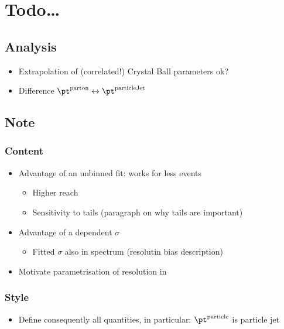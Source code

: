

\section{Todo\ldots}

\subsection{Analysis}
\begin{itemize}
\item Extrapolation of (correlated!) Crystal Ball parameters ok?
\item Difference $\pt^{\text{parton}} \leftrightarrow \pt^{\text{particleJet}}$
\end{itemize}


\subsection{Note}

\subsubsection{Content}
\begin{itemize}
\item Advantage of an unbinned fit: works for less events
  \begin{itemize}
  \item Higher \pt reach
  \item Sensitivity to tails (paragraph on why tails are important)
  \end{itemize}
\item Advantage of a \pt dependent $\sigma$
  \begin{itemize}
  \item Fitted $\sigma$ also in spectrum (resolutin bias description)
  \end{itemize}
\item Motivate parametrisation of resolution in \pt
\end{itemize}

\subsubsection{Style}
\begin{itemize}
\item Define consequently all quantities, in particular: $\pt^{\text{particle}}$ is particle jet \pt
\end{itemize}
